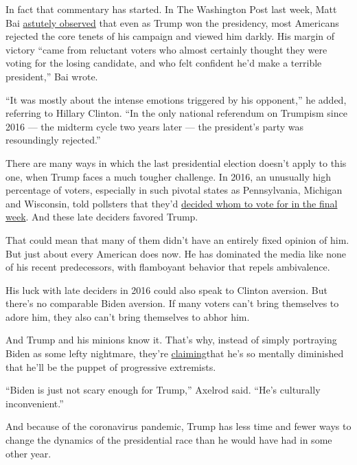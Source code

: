 In fact that commentary has started. In The Washington Post last week,
Matt Bai
\href{https://www.washingtonpost.com/opinions/2020/06/22/2016-what-democrats-get-wrong-about-that-election/}{astutely
observed} that even as Trump won the presidency, most Americans rejected
the core tenets of his campaign and viewed him darkly. His margin of
victory ``came from reluctant voters who almost certainly thought they
were voting for the losing candidate, and who felt confident he'd make a
terrible president,'' Bai wrote.

``It was mostly about the intense emotions triggered by his opponent,''
he added, referring to Hillary Clinton. ``In the only national
referendum on Trumpism since 2016 --- the midterm cycle two years later
--- the president's party was resoundingly rejected.''

There are many ways in which the last presidential election doesn't
apply to this one, when Trump faces a much tougher challenge. In 2016,
an unusually high percentage of voters, especially in such pivotal
states as Pennsylvania, Michigan and Wisconsin, told pollsters that
they'd
\href{https://www.washingtonpost.com/news/the-fix/wp/2016/11/17/how-america-decided-at-the-very-last-moment-to-elect-donald-trump/}{decided
whom to vote for in the final week}. And these late deciders favored
Trump.

That could mean that many of them didn't have an entirely fixed opinion
of him. But just about every American does now. He has dominated the
media like none of his recent predecessors, with flamboyant behavior
that repels ambivalence.

His luck with late deciders in 2016 could also speak to Clinton
aversion. But there's no comparable Biden aversion. If many voters can't
bring themselves to adore him, they also can't bring themselves to abhor
him.

And Trump and his minions know it. That's why, instead of simply
portraying Biden as some lefty nightmare, they're
\href{https://www.nytimes3xbfgragh.onion/2020/05/17/opinion/trump-biden-age.html}{claiming}that
he's so mentally diminished that he'll be the puppet of progressive
extremists.

``Biden is just not scary enough for Trump,'' Axelrod said. ``He's
culturally inconvenient.''

And because of the coronavirus pandemic, Trump has less time and fewer
ways to change the dynamics of the presidential race than he would have
had in some other year.

